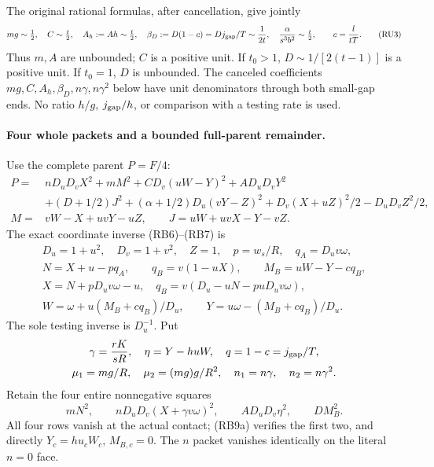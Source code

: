 The original rational formulas, after cancellation, give jointly
\[
 mg\sim\tfrac12,\quad C\sim\tfrac t2,\quad
 A_h:=Ah\sim\tfrac t2,\quad
 \beta_D:=D(1-c)=Dj_{\rm gap}/T\sim\frac1{2t},
 \quad \frac\alpha{s^3b^2}\sim\tfrac t2,
 \qquad c=\frac l{tT}.
 \tag{RU3}
\]
Thus $m,A$ are unbounded; $C$ is a positive unit. If $t_0>1$,
$D\sim1/[2(t-1)]$ is a positive unit. If $t_0=1$, $D$ is unbounded.
The canceled coefficients $mg,C,A_h,\beta_D,n\gamma,n\gamma^2$
below have unit denominators through both small-gap ends. No ratio
$h/g$, $j_{\rm gap}/h$, or comparison with a testing rate is used.

\paragraph{Four whole packets and a bounded full-parent remainder.}
Use the complete parent $P=F/4$:
\[
\begin{aligned}
 P={}&nD_uD_vX^2+mM^2+CD_v(uW-Y)^2+AD_uD_vY^2\\
 &+(D+1/2)J^2+(\alpha+1/2)D_u(vY-Z)^2
                   +D_v(X+uZ)^2/2-D_uD_vZ^2/2,\\
 M={}&vW-X+uvY-uZ,\qquad J=uW+uvX-Y-vZ.
\end{aligned}
\]
The exact coordinate inverse (RB6)--(RB7) is
\[
\begin{gathered}
 D_u=1+u^2,\quad D_v=1+v^2,\quad Z=1,\quad
 p=w_s/R,\quad q_A=D_uv\omega,\\
 N=X+u-pq_A,\qquad q_B=v(1-uX),\qquad M_B=uW-Y-cq_B,\\
 X=N+pD_uv\omega-u,\quad q_B=v(D_u-uN-puD_uv\omega),\\
 W=\omega+u(M_B+cq_B)/D_u,\qquad
 Y=u\omega-(M_B+cq_B)/D_u.
\end{gathered}                                                     \tag{RU4}
\]
The sole testing inverse is $D_u^{-1}$. Put
\[
 \begin{gathered}
 \gamma=\frac{rK}{sR},\quad \eta=Y-huW,\quad q=1-c=j_{\rm gap}/T,\\
 \mu_1=mg/R,\quad \mu_2=(mg)g/R^2,\quad n_1=n\gamma,\quad n_2=n\gamma^2.
 \end{gathered}
\]
Retain the four entire nonnegative squares
\[
 mN^2,\qquad nD_uD_v(X+\gamma v\omega)^2,
 \qquad AD_uD_v\eta^2,\qquad DM_B^2.
 \tag{RU5}
\]
All four rows vanish at the actual contact; (RB9a) verifies the first
two, and directly $Y_c=hu_cW_c$, $M_{B,c}=0$.
The $n$ packet vanishes identically on the literal $n=0$ face.

